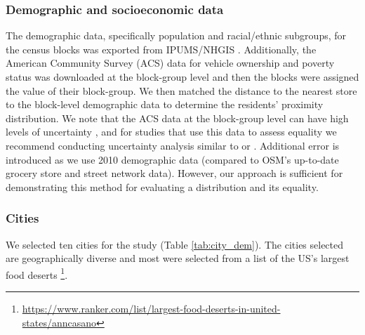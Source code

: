 \documentclass[final,3p,times,onecolumn,sort&compress]{elsarticle}
\begin{document}
\subsubsection{Demographic and socioeconomic data}
The demographic data, specifically population and racial/ethnic subgroups, for the census blocks was exported from IPUMS/NHGIS \citep{Manson2018-ug}.
Additionally, the American Community Survey (ACS) data for vehicle ownership and poverty status was downloaded at the block-group level and then the blocks were assigned the value of their block-group.
We then matched the distance to the nearest store to the block-level demographic data to determine the residents' proximity distribution.
We note that the ACS data at the block-group level can have high levels of uncertainty \citep{Folch2016-tm}, and for studies that use this data to assess equality we recommend conducting uncertainty analysis similar to \cite{Williams2020-greenspace} or \cite{Rigolon2017-qu}.
Additional error is introduced as we use 2010 demographic data (compared to OSM's up-to-date grocery store and street network data).
However, our approach is sufficient for demonstrating this method for evaluating a distribution and its equality. 


\subsubsection{Cities}
We selected ten cities for the study (Table \ref{tab:city_dem}).
The cities selected are geographically diverse and most were selected from a list of the US's largest food deserts \footnote{\url{https://www.ranker.com/list/largest-food-deserts-in-united-states/anncasano}}. 
\end{document}
